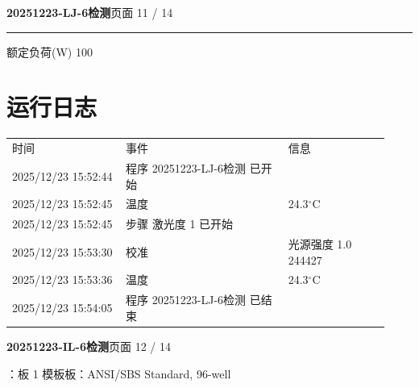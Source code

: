 \documentclass[UTF8,10pt,a4paper,fontset=fandol]{ctexart}
\newcommand{\fieldvalue}[1]{#1}
\begin{document}
\newpage

\noindent\textbf{20251223-LJ-6检测}\hfill 页面 11 / 14

\noindent\rule{\linewidth}{0.4pt}

\noindent 额定负荷(W)\quad
\fieldvalue{100}

\section*{运行日志}

\begin{tabular}{@{}p{0.28\linewidth}p{0.40\linewidth}p{0.25\linewidth}@{}}
时间 & 事件 & 信息 \\[2pt]
2025/12/23 15:52:44 & 程序 20251223-LJ-6检测 已开始 & \\ 
2025/12/23 15:52:45 & 温度 & 24.3$^\circ$C \\ 
2025/12/23 15:52:45 & 步骤 激光度 1 已开始 & \\ 
2025/12/23 15:53:30 & 校准 & 光源强度 1.0 244427 \\ 
2025/12/23 15:53:36 & 温度 & 24.3$^\circ$C \\ 
2025/12/23 15:54:05 & 程序 20251223-LJ-6检测 已结束 & 
\end{tabular}

\newpage

\noindent\textbf{20251223-IL-6检测}\hfill 页面 12 / 14

\vspace{0.5em}

：板 1 \hfill 模板板：ANSI/SBS Standard, 96-well

\vspace{0.5em}
\end{document}
